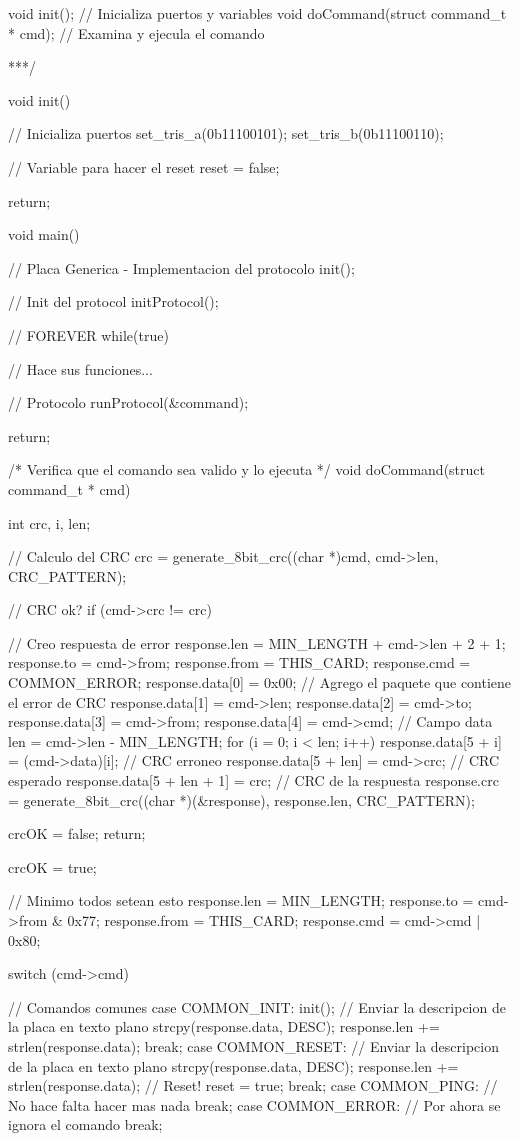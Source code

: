 {\begin{verbatimtab}
void init(); // Inicializa puertos y variables
void doCommand(struct command_t * cmd); // Examina y ejecula el comando

***/

void init()
{
	// Inicializa puertos
	set_tris_a(0b11100101);
	set_tris_b(0b11100110);

	// Variable para hacer el reset
	reset = false;

	return;	
}	

void main()
{
	// Placa Generica - Implementacion del protocolo
	init();

	// Init del protocol
	initProtocol();

	// FOREVER
	while(true)
	{
		// Hace sus funciones...

		// Protocolo
		runProtocol(&command);
	}

	return;
}

/* Verifica que el comando sea valido y lo ejecuta */
void doCommand(struct command_t * cmd)
{
	int crc, i, len;
		
	// Calculo del CRC
	crc = generate_8bit_crc((char *)cmd, cmd->len, CRC_PATTERN);
	
	// CRC ok?
	if (cmd->crc != crc)
	{		
		// Creo respuesta de error
		response.len = MIN_LENGTH + cmd->len + 2 + 1;
		response.to = cmd->from;
		response.from = THIS_CARD;
		response.cmd = COMMON_ERROR;
		response.data[0] = 0x00;
		// Agrego el paquete que contiene el error de CRC
		response.data[1] = cmd->len;
		response.data[2] = cmd->to;
		response.data[3] = cmd->from;
		response.data[4] = cmd->cmd;
		// Campo data
		len = cmd->len - MIN_LENGTH;
		for (i = 0; i < len; i++)
			response.data[5 + i] = (cmd->data)[i];
		// CRC erroneo
		response.data[5 + len] = cmd->crc;
		// CRC esperado
		response.data[5 + len + 1] = crc;
		// CRC de la respuesta
		response.crc = generate_8bit_crc((char *)(&response), response.len, CRC_PATTERN);
	
		crcOK = false;
		return;
	}

	crcOK = true;
	
	// Minimo todos setean esto
	response.len = MIN_LENGTH;
	response.to = cmd->from & 0x77;
	response.from = THIS_CARD;
	response.cmd = cmd->cmd | 0x80;

	switch (cmd->cmd)
	{
		// Comandos comunes
		case COMMON_INIT: 
			init();
			// Enviar la descripcion de la placa en texto plano
			strcpy(response.data, DESC);
			response.len += strlen(response.data);
		break;
		case COMMON_RESET: 
			// Enviar la descripcion de la placa en texto plano
			strcpy(response.data, DESC);
			response.len += strlen(response.data);
			// Reset!
			reset = true;
		break;
		case COMMON_PING: 
			// No hace falta hacer mas nada
		break;
 		case COMMON_ERROR:
			// Por ahora se ignora el comando
		break;
		
}}
\end{verbatimtab}}
